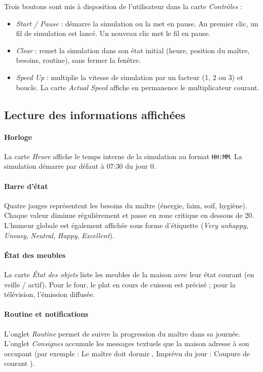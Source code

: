 Trois boutons sont mis à disposition de l'utilisateur dans la carte \textit{Contrôles} :
\begin{itemize}
\item \textit{Start / Pause} : démarre la simulation ou la met en pause. Au premier clic, un fil de simulation est lancé. Un nouveau clic met le fil en pause.
\item \textit{Clear} : remet la simulation dans son état initial (heure, position du maître, besoins, routine), sans fermer la fenêtre.
\item \textit{Speed Up} : multiplie la vitesse de simulation par un facteur (1, 2 ou 3) et boucle. La carte \textit{Actual Speed} affiche en permanence le multiplicateur courant.
\end{itemize}

\subsection{Lecture des informations affichées}

\paragraph{Horloge} La carte \textit{Heure} affiche le temps interne de la simulation au format \texttt{HH:MM}. La simulation démarre par défaut à 07:30 du jour 0.

\paragraph{Barre d'état} Quatre jauges représentent les besoins du maître (énergie, faim, soif, hygiène). Chaque valeur diminue régulièrement et passe en zone critique en dessous de 20. L'humeur globale est également affichée sous forme d'étiquette (\textit{Very unhappy}, \textit{Uneasy}, \textit{Neutral}, \textit{Happy}, \textit{Excellent}).

\paragraph{État des meubles} La carte \textit{État des objets} liste les meubles de la maison avec leur état courant (en veille / actif). Pour le four, le plat en cours de cuisson est précisé ; pour la télévision, l'émission diffusée.

\paragraph{Routine et notifications} L'onglet \textit{Routine} permet de suivre la progression du maître dans sa journée. L'onglet \textit{Consignes} accumule les messages textuels que la maison adresse à son occupant (par exemple : \og Le maître doit dormir \fg, \og Imprévu du jour : Coupure de courant \fg).

